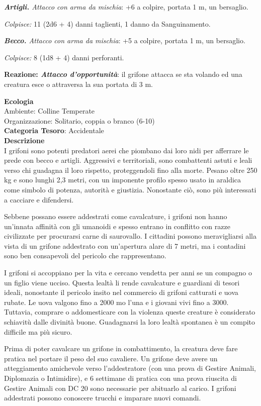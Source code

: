 \begin{multicols}{2}
{\emph{\textbf{Artigli.} Attacco con arma da mischia}: +6 a colpire, portata 1 m, un bersaglio.

\emph{Colpisce:} 11 (2d6 + 4) danni taglienti, 1 danno da Sanguinamento.

\emph{\textbf{Becco.} Attacco con arma da mischia}: +5 a colpire, portata 1 m, un bersaglio.

\emph{Colpisce:} 8 (1d8 + 4) danni perforanti.

\textbf{Reazione: \emph{Attacco d'opportunità}}: il grifone attacca se sta volando ed una creatura esce o attraversa la sua portata di 3 m.

\textbf{Ecologia}\\
Ambiente: Colline Temperate\\
Organizzazione: Solitario, coppia o branco (6-10)\\
\textbf{Categoria Tesoro}: Accidentale\\
\textbf{Descrizione}\\
I grifoni sono potenti predatori aerei che piombano dai loro nidi per afferrare le prede con becco e artigli. Aggressivi e territoriali, sono combattenti astuti e leali verso chi guadagna il loro rispetto, proteggendoli fino alla morte. Pesano oltre 250 kg e sono lunghi 2,3 metri, con un imponente profilo spesso usato in araldica come simbolo di potenza, autorità e giustizia. Nonostante ciò, sono più interessati a cacciare e difendersi.

Sebbene possano essere addestrati come cavalcature, i grifoni non hanno un'innata affinità con gli umanoidi e spesso entrano in conflitto con razze civilizzate per procurarsi carne di saurovallo. I cittadini possono meravigliarsi alla vista di un grifone addestrato con un'apertura alare di 7 metri, ma i contadini sono ben consapevoli del pericolo che rappresentano.

I grifoni si accoppiano per la vita e cercano vendetta per anni se un compagno o un figlio viene ucciso. Questa lealtà li rende cavalcature e guardiani di tesori ideali, nonostante il pericolo insito nel commercio di grifoni catturati e uova rubate. Le uova valgono fino a 2000 mo l'una e i giovani vivi fino a 3000. Tuttavia, comprare o addomesticare con la violenza queste creature è considerato schiavitù dalle divinità buone. Guadagnarsi la loro lealtà spontanea è un compito difficile ma più sicuro.

Prima di poter cavalcare un grifone in combattimento, la creatura deve fare pratica nel portare il peso del suo cavaliere. Un grifone deve avere un atteggiamento amichevole verso l'addestratore (con una prova di Gestire Animali, Diplomazia o Intimidire), e 6 settimane di pratica con una prova riuscita di Gestire Animali con DC 20 sono necessarie per abituarlo al carico. I grifoni addestrati possono conoscere trucchi e imparare nuovi comandi.

}
\end{multicols}

